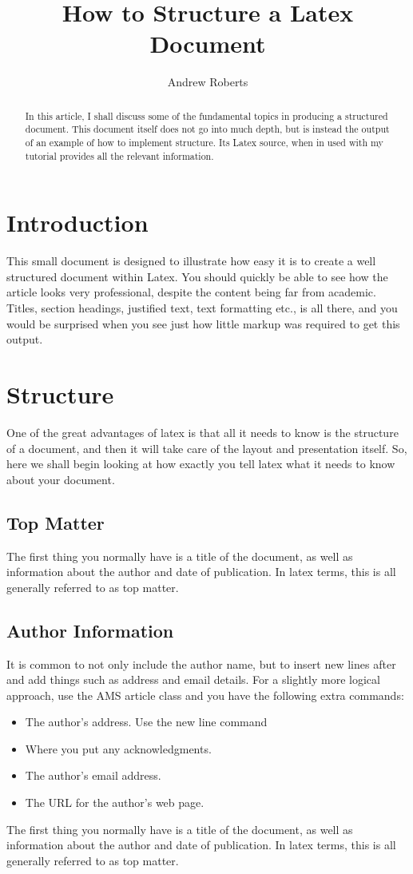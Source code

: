 

	\title{How to Structure a Latex Document} 
	\author{Andrew Roberts}  

	\begin{abstract}
		In this article, I shall discuss some of the fundamental topics in
		producing a structured document.  This document itself does not go into
		much depth, but is instead the output of an example of how to implement
		structure. Its Latex source, when in used with my tutorial
		provides all the relevant information.  \end{abstract}
	
	\section{Introduction}
	This small document is designed to illustrate how easy it is to create a
	well structured document within Latex.  You should quickly be able to
	see how the article looks very professional, despite the content being
	far from academic.  Titles, section headings, justified text, text
	formatting etc., is all there, and you would be surprised when you see
	just how little markup was required to get this output.
	
	\section{Structure}
	One of the great advantages of latex is that all it needs to know is
	the structure of a document, and then it will take care of the layout
	and presentation itself.  So, here we shall begin looking at how exactly
	you tell latex what it needs to know about your document.
	
	\subsection{Top Matter}
	The first thing you normally have is a title of the document, as well as
	information about the author and date of publication. In latex terms,
	this is all generally referred to as top matter.

	\subsection{Author Information}
	It is common to not only include the author name, but to insert new
	lines after and add things such
	as address and email details.  For a slightly more logical approach, use
	the AMS article class and you have the following extra
	commands:

	\begin{itemize}
		\item  The author's address.  Use
		the new line command
		\item Where you put any acknowledgments.
		\item The author's email address.
		\item The URL for the author's web page.
	\end{itemize}

	The first thing you normally have is a title of the document, as well as
	information about the author and date of publication. In latex terms,
	this is all generally referred to as top matter.

	
